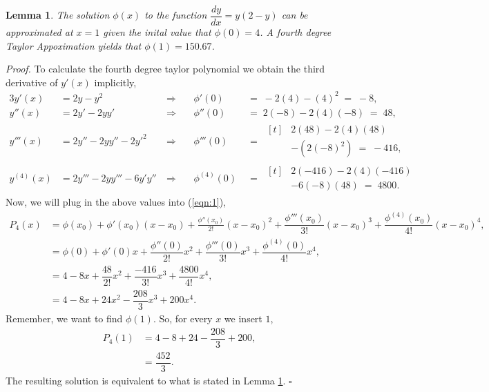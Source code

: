 \documentclass[12pt, letterpaper]{article}  %
\newtheorem{lem}[thrm]{Lemma}
\begin{document}
\begin{lem}\label{Le_2}
  The solution $\phi(x)$ to the function $\dfrac{dy}{dx} = y(2-y)$ can be approximated at $x = 1$ 
  given the inital value that $\phi\left(0\right) = 4$. A fourth degree Taylor Appoximation yields
  that $\phi\left(1\right) = 150.67$. \\
\end{lem}
\textit{Proof.} To calculate the fourth degree taylor polynomial we obtain the
third derivative of $y'(x)$ implicitly,   
\begin{alignat*}{3}
  y'(x) &= 2y-y^2 &\ \Rightarrow\ & &\phi'\left(0\right)\; &=\; -2(4) - (4)^2\; =\; -8,\\
  y''(x) &= 2y' - 2yy' &\ \Rightarrow\ &  
         &\phi''\left(0\right)\; &=\; 2(-8) -2(4)(-8)\; =\; 48, \\
  y'''(x) &= 2y'' - 2yy'' - 2y'^2 &\ \Rightarrow\ &
          &\phi'''\left(0\right)\; &=\;
  \begin{aligned}[t]
          &2(48) - 2(4)(48) \\
          &-(2(-8)^2)\; =\; -416,
  \end{aligned} \\
  y^{(4)}(x) &= 2y''' - 2yy''' - 6y'y'' &\ \Rightarrow\ & 
             &\phi^{(4)}\left(0\right)\; &=\; 
  \begin{aligned}[t]
    &2(-416) - 2(4)(-416) \\
    &- 6(-8)(48)\; =\; 4800. 
  \end{aligned}
\end{alignat*}
Now, we will plug in the above values into (\ref{eqn:1}),
\begin{align*}
  P_4(x) &= \phi(x_0) + \phi'(x_0)(x-x_0) + \frac{\phi''(x_0)}{2!}(x-x_0)^2 + \dfrac{\phi'''(x_0)}{3!}(x-x_0)^3 
  + \dfrac{\phi^{(4)}(x_0)}{4!}(x-x_0)^4, \\
  &= \phi(0) + \phi'(0)x + \dfrac{\phi''(0)}{2!}x^2 + \dfrac{\phi'''(0)}{3!}x^3 + \dfrac{\phi^{(4)}(0)}{4!}
  x^4, \\
  &= 4 - 8x + \dfrac{48}{2!}x^2 + \dfrac{-416}{3!}x^3 + \dfrac{4800}{4!}x^4, \\
  &= 4 - 8x + 24x^2 - \dfrac{208}{3}x^3 + 200x^4. 
\end{align*}
Remember, we want to  find $\phi(1)$.  So, for every $x$ we insert $1$,
\begin{align*}
  P_4(1) &= 4 - 8 + 24 - \dfrac{208}{3} + 200, \\
         &= \dfrac{452}{3}.
\end{align*}
The resulting solution is equivalent to what is stated in Lemma \ref{Le_2}. $\square$ \\
\end{document}
